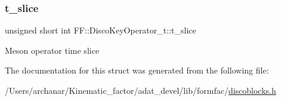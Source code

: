 \subsubsection{\texorpdfstring{t\_slice}{t\_slice}}
{\footnotesize\ttfamily unsigned short int F\+F\+::\+Disco\+Key\+Operator\+\_\+t\+::t\+\_\+slice}

Meson operator time slice 

The documentation for this struct was generated from the following file\+:\begin{DoxyCompactItemize}
\item 
/\+Users/archanar/\+Kinematic\+\_\+factor/adat\+\_\+devel/lib/formfac/\mbox{\hyperlink{lib_2formfac_2discoblocks_8h}{discoblocks.\+h}}\end{DoxyCompactItemize}
